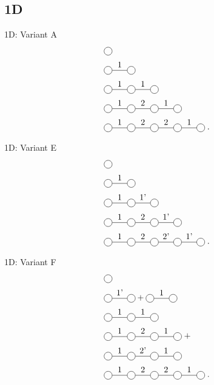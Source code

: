 \subsection{1D}
\begin{frame}{1D: Variant A}
    \begin{subequations}
        \begin{align}
             & \mpob{1}{ {,}  }{}{}{}{{,,}}                                      \\
             & \mpob{2}{ {,"1",}  }{}{}{}{{,,}}                                  \\
             & \mpob{3}{ {,"1","1",}  }{}{}{}{{,,,}}                             \\
             & \mpob{4}{ {,"1","2","1",}  }{}{}{}{{,,,,,}}    \label{2sitepatch} \\
             & \mpob{5}{ {,"1","2","2","1",}  }{}{}{}{{,,,,,}} \; .
        \end{align}
    \end{subequations}
\end{frame}

\begin{frame}{1D: Variant E}
    \begin{subequations}
        \begin{align}
             & \mpob{1}{ {,}  }{}{}{}{{,,}}                          \\
             & \mpob{2}{ {,"1",}  }{}{}{}{{,,}}                      \\
             & \mpob{3}{ {,"1","1'",}  }{}{}{}{{,,,}}                \\
             & \mpob{4}{ {,"1","2","1'",}  }{}{}{}{{,,,,,}}          \\
             & \mpob{5}{ {,"1","2","2'","1'",}  }{}{}{}{{,,,,,}} \;.
        \end{align}
    \end{subequations}
\end{frame}

\begin{frame}{1D: Variant F}
    \begin{subequations}
        \begin{align}
             & \mpob{1}{ {,}  }{}{}{}{{,,}}                                         \\
             & \mpob{2}{ {,"1'",}  }{}{}{}{{,,}}+  \mpob{2}{ {,"1",}  }{}{}{}{{,,}} \\
             & \mpob{3}{ {,"1","1",}  }{}{}{}{{,,,}}                                \\
             & \mpob{4}{ {,"1","2","1",}  }{}{}{}{{,,,,,}} \; +  \nonumber          \\
             & \mpob{4}{ {,"1","2'","1",}  }{}{}{}{{,,,,,}}                         \\
             & \mpob{5}{ {,"1","2","2","1",}  }{}{}{}{{,,,,,}} \;.
        \end{align}
    \end{subequations}
\end{frame}

